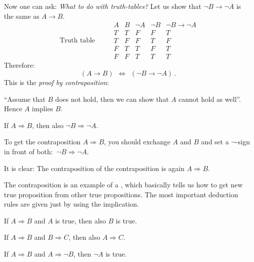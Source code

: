    
Now one can ask:
\emph{What to do with truth-tables?} 
Let us show that $\neg B \rightarrow \neg A$ is the same as $A \rightarrow B$.
   \begin{equation}
   \mbox{ Truth table }\qquad 
    \begin{array}{cc|cc|c}
     A & B &  \neg A & \neg B &\neg B \rightarrow \neg A \\ \hline
     T & T &   F & F & T\\
     T & F &   F & T & F\\
     F & T &   T & F & T\\
     F & F &   T & T & T
    \end{array}
   \end{equation}
Therefore:
	$$
		(A \rightarrow B) ~~ \Leftrightarrow
		~~
		(\neg B \rightarrow \neg A) \,.
	$$
This is the \emph{proof by contraposition}:


``Assume that $B$ does not hold, then we can show that $A$ cannot hold as well''. Hence $A$ implies $B$.
%
\begin{Boxx}[Contraposition]
If  $A \Rightarrow B$, then also $\neg B \Rightarrow \neg A$.
\end{Boxx}

\begin{Faust}[Contraposition]
To get the contraposition $A\Rightarrow B$, you should exchange $A$ and $B$ and set a $\neg$-sign in front of both:
$\ \neg B\Rightarrow\neg A$.

It is clear: The contraposition of the contraposition is again $A\Rightarrow B$.
\end{Faust}

The contraposition is an example of a , which basically
tells us how to get new true proposition from other true propositions. The most important deduction rules are given just by using the implication.

\begin{Boxx}
If $A \Rightarrow B$ and $A$ is true, then also $B$ is true.
\end{Boxx}

\begin{Boxx}
 If $A \Rightarrow B$ and $B \Rightarrow C$, then also $A \Rightarrow C$.
\end{Boxx}

\begin{Boxx}
 If $A \Rightarrow B$ and $A \Rightarrow \neg B$, then $\neg A$ is true.
\end{Boxx}

